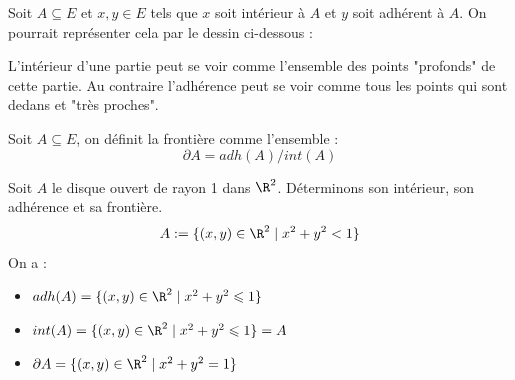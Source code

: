 \begin{remark}[Illustration]
    Soit $A \subseteq E$ et $x,y \in E$ tels que $x$ soit intérieur à $A$ et $y$ soit adhérent à $A$. 
    On pourrait représenter cela par le dessin ci-dessous :

    \begin{center}
    \end{center}

    L'intérieur d'une partie peut se voir comme l'ensemble des points "profonds" de cette partie. 
    Au contraire l'adhérence peut se voir comme tous les points qui sont dedans et "très proches". 
\end{remark}

\begin{definition}[Frontière]
    Soit $A \subseteq E$, on définit la frontière comme l'ensemble :
        \[ \partial A = adh(A) / int(A) \] 
\end{definition}

\begin{example}
    Soit $A$ le disque ouvert de rayon 1 dans $\R^2$. Déterminons son intérieur, son adhérence et sa frontière. 
        \[ A := \{ (x,y) \in \R^2 \; | \; x^2 + y^2 < 1 \} \] 
    On a : 
    \begin{itemize}
        \item $adh(A) = \{ (x,y) \in \R^2 \; | \; x^2 + y^2 \leqslant 1 \} $
        \item $int(A) = \{ (x,y) \in \R^2 \; | \; x^2 + y^2 \leqslant 1 \} = A $
        \item $\partial A = \{ (x,y) \in \R^2 \; | \; x^2 + y^2 = 1 \} $
    \end{itemize}
\end{example}


